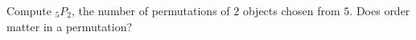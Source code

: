 Compute ${}_5P_2$, the number of permutations of $2$ objects chosen from $5$. Does order matter in a permutation?
